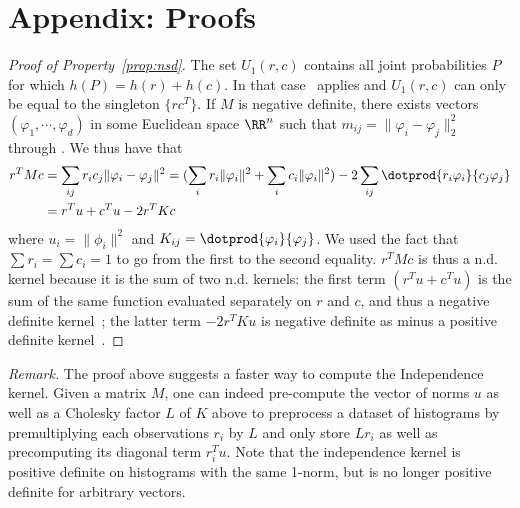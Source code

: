 \documentclass{amsart} %
\providecommand{\norm}[1]{\lVert#1\rVert}
\begin{document}
\section{Appendix: Proofs}

\begin{proof}[Proof of Property~\ref{prop:nsd}]
The set $U_1(r,c)$ contains all joint probabilities $P$ for which $h(P)=h(r)+h(c)$. In that case~\citep[Theorem 2.6.6]{cover91elements} applies and $U_1(r,c)$ can only be equal to the singleton $\{rc^T\}$. If $M$ is negative definite, there exists vectors $(\varphi_1,\cdots,\varphi_d)$ in some Euclidean space $\RR^n$ such that $m_{ij}=\norm{\varphi_i-\varphi_j}_2^2$	through \citep[\S3.3.2]{berg84harmonic}. We thus have that 
$$\begin{aligned}r^TM c&= \sum_{ij}r_i c_j \norm{\varphi_i-\varphi_j}^2= (\sum_{i}r_i \norm{\varphi_i}^2 + \sum_{i} c_i \norm{\varphi_i}^2) - 2\sum_{ij} \dotprod{r_i\varphi_i}{c_j\varphi_j}\\&= r^Tu + c^Tu - 2 r^TK c\end{aligned}$$
where $u_i=\norm{\phi_i}^2$ and $K_{ij}=\dotprod{\varphi_i}{\varphi_j}$. We used the fact that $\sum r_i=\sum c_i=1$ to go from the first to the second equality. $r^TMc$ is thus a n.d. kernel because it is the sum of two n.d. kernels: the first term $(r^Tu+c^Tu)$ is the sum of the same function evaluated separately on $r$ and $c$, and thus a negative definite kernel~\citep[\S3.2.10]{berg84harmonic}; the latter term $-2r^TKu$ is negative definite as minus a positive definite kernel~\citep[Definition \S3.1.1]{berg84harmonic}.\end{proof}	
\emph{Remark.} The proof above suggests a faster way to compute the Independence kernel. Given a matrix $M$, one can indeed pre-compute the vector of norms $u$ as well as a Cholesky factor $L$ of $K$ above to preprocess a dataset of histograms by premultiplying each observations $r_i$ by $L$ and only store $Lr_i$ as well as precomputing its diagonal term $r_i^Tu$. Note that the independence kernel is positive definite on histograms with the same 1-norm, but is no longer positive definite for arbitrary vectors.
\end{document}
